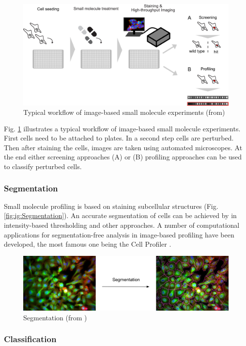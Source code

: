 \begin{figure}[H]
	\centering
	\includegraphics[width=0.8\linewidth]{bilder/cells/hcu.png}
	\caption{Typical workflow of image-based small molecule experiments (from\cite{Scheeder2018})}
	\label{fig:Workflow}
\end{figure}

Fig. \ref{fig:Workflow} illustrates a typical workflow of image-based small molecule experiments. First cells need to be attached to plates. In a second step cells are perturbed. Then after staining the cells, images are taken using automated microscopes. At the end either screening approaches (A) or (B) profiling approaches can be used to classify perturbed cells.

\subsubsection{Segmentation}

Small molecule profiling is based on staining subcellular structures (Fig. \ref{fig:ig:Segmentation}). 
An accurate segmentation of cells can be achieved by in intensity-based thresholding and other approaches. A number of computational applications for segmentation-free analysis in image-based profiling have been developed, the most famous one being the Cell Profiler \cite{CellProfiler}.


\begin{figure}[H]
	\centering
	\includegraphics[width=0.8\linewidth]{bilder/cells/segmentation.png}
	\caption{Segmentation (from \cite{Pau})}
	\label{fig:Segmentation}
\end{figure}


\subsubsection{Classification}


